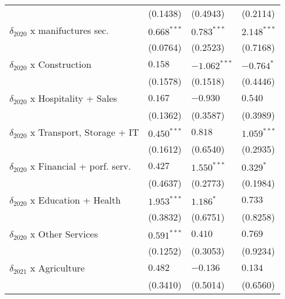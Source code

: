 \begin{tabular}{llll}
                                                   &           (0.1438) &           (0.4943) &           (0.2114) \\
$\delta_{2020}$ x manifuctures sec.                &      $0.668^{***}$ &      $0.783^{***}$ &      $2.148^{***}$ \\
                                                   &           (0.0764) &           (0.2523) &           (0.7168) \\
$\delta_{2020}$ x Construction                     &            $0.158$ &     $-1.062^{***}$ &         $-0.764^*$ \\
                                                   &           (0.1578) &           (0.1518) &           (0.4446) \\
$\delta_{2020}$ x Hospitality + Sales              &            $0.167$ &           $-0.930$ &            $0.540$ \\
                                                   &           (0.1362) &           (0.3587) &           (0.3989) \\
$\delta_{2020}$ x Transport, Storage + IT          &      $0.450^{***}$ &            $0.818$ &      $1.059^{***}$ \\
                                                   &           (0.1612) &           (0.6540) &           (0.2935) \\
$\delta_{2020}$ x Financial + porf. serv.          &            $0.427$ &      $1.550^{***}$ &          $0.329^*$ \\
                                                   &           (0.4637) &           (0.2773) &           (0.1984) \\
$\delta_{2020}$ x Education + Health               &      $1.953^{***}$ &          $1.186^*$ &            $0.733$ \\
                                                   &           (0.3832) &           (0.6751) &           (0.8258) \\
$\delta_{2020}$ x Other Services                   &      $0.591^{***}$ &            $0.410$ &            $0.769$ \\
                                                   &           (0.1252) &           (0.3053) &           (0.9234) \\
$\delta_{2021}$ x Agriculture                      &            $0.482$ &           $-0.136$ &            $0.134$ \\
                                                   &           (0.3410) &           (0.5014) &           (0.6560) \\

\end{tabular}

